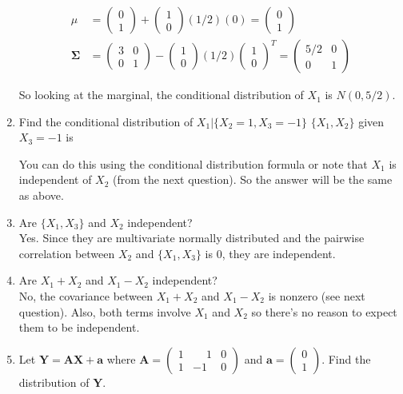 \documentclass[11pt]{article}
\theoremstyle{definition}
\begin{document}
\begin{enumerate}
\begin{align*}
\mu &= \begin{pmatrix} 0 \\ 1 \end{pmatrix} + \begin{pmatrix} 1 \\ 0 \end{pmatrix} (1/2) (0) =  \begin{pmatrix} 0 \\ 1 \end{pmatrix}\\
\mathbf{\Sigma} &= \begin{pmatrix} 3 & 0 \\0 & 1 \end{pmatrix} - \begin{pmatrix} 1 \\ 0 \end{pmatrix}(1/2) \begin{pmatrix} 1 \\ 0 \end{pmatrix}^T = \begin{pmatrix}5/2 & 0\\0 & 1\end{pmatrix}
\end{align*}

So looking at the marginal, the conditional distribution of $X_1$ is $N(0, 5/2)$.

\item Find the conditional distribution of $X_1|\{X_2 = 1, X_3 = -1\}$
$\{X_1, X_2\}$ given $X_3 = -1$ is

You can do this using the conditional distribution formula or note that $X_1$ is independent of $X_2$ (from the next question).  So the answer will be the same as above.

\item Are $\{X_1, X_3\}$ and $X_2$ independent?\\
Yes.  Since they are multivariate normally distributed and the pairwise correlation between $X_2$ and $\{X_1, X_3\}$ is 0, they are independent.

\item Are $X_1 + X_2$ and $X_1 - X_2$ independent?\\
No, the covariance between  $X_1 + X_2$ and $X_1 - X_2$ is nonzero (see next question).  Also, both terms involve $X_1$ and $X_2$ so there's no reason to expect them to be independent.  

\item Let $\mathbf{Y} = \mathbf{AX} + \mathbf{a}$ where $\mathbf{A} = \begin{pmatrix} 1 & \phantom{-}1 & 0\\1 & -1 & 0\end{pmatrix}$ and $\mathbf{a} = \begin{pmatrix}0 \\ 1 \end{pmatrix}$.  Find the distribution of $\mathbf{Y}$.


\end{enumerate}
\end{document}
